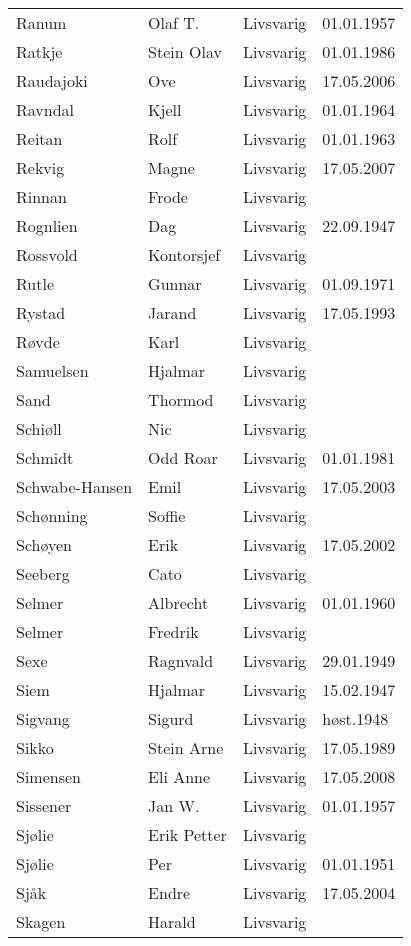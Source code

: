\begin{longtable}{llll}
Ranum	&	Olaf T.	&	Livsvarig 	&	01.01.1957	\\
Ratkje	&	Stein Olav	&	Livsvarig 	&	01.01.1986	\\
Raudajoki	&	Ove	&	Livsvarig	&	17.05.2006	\\
Ravndal	&	Kjell	&	Livsvarig 	&	01.01.1964	\\
Reitan	&	Rolf	&	Livsvarig 	&	01.01.1963	\\
Rekvig	&	Magne	&	Livsvarig	&	17.05.2007	\\
Rinnan	&	Frode	&	Livsvarig 	&		\\
Rognlien	&	Dag	&	Livsvarig 	&	22.09.1947	\\
Rossvold	&	Kontorsjef	&	Livsvarig 	&		\\
Rutle	&	Gunnar	&	Livsvarig 	&	01.09.1971	\\
Rystad	&	Jarand	&	Livsvarig 	&	17.05.1993	\\
Røvde	&	Karl	&	Livsvarig 	&		\\
Samuelsen	&	Hjalmar	&	Livsvarig 	&		\\
Sand	&	Thormod	&	Livsvarig 	&		\\
Schiøll	&	Nic	&	Livsvarig 	&		\\
Schmidt	&	Odd Roar	&	Livsvarig 	&	01.01.1981	\\
Schwabe-Hansen 	&	Emil	&	Livsvarig	&	17.05.2003	\\
Schønning	&	Soffie	&	Livsvarig 	&		\\
Schøyen 	&	Erik	&	Livsvarig	&	17.05.2002	\\
Seeberg	&	Cato	&	Livsvarig 	&		\\
Selmer	&	Albrecht	&	Livsvarig 	&	01.01.1960	\\
Selmer	&	Fredrik	&	Livsvarig 	&		\\
Sexe	&	Ragnvald	&	Livsvarig 	&	29.01.1949	\\
Siem	&	Hjalmar	&	Livsvarig 	&	15.02.1947	\\
Sigvang	&	Sigurd	&	Livsvarig	&	høst.1948	\\
Sikko	&	Stein Arne	&	Livsvarig 	&	17.05.1989	\\
Simensen	&	Eli Anne	&	Livsvarig	&	17.05.2008	\\
Sissener	&	Jan W.	&	Livsvarig 	&	01.01.1957	\\
Sjølie	&	Erik Petter	&	Livsvarig 	&		\\
Sjølie	&	Per	&	Livsvarig 	&	01.01.1951	\\
Sjåk 	&	Endre	&	Livsvarig	&	17.05.2004	\\
Skagen	&	Harald	&	Livsvarig 	&		\\

\end{longtable}
